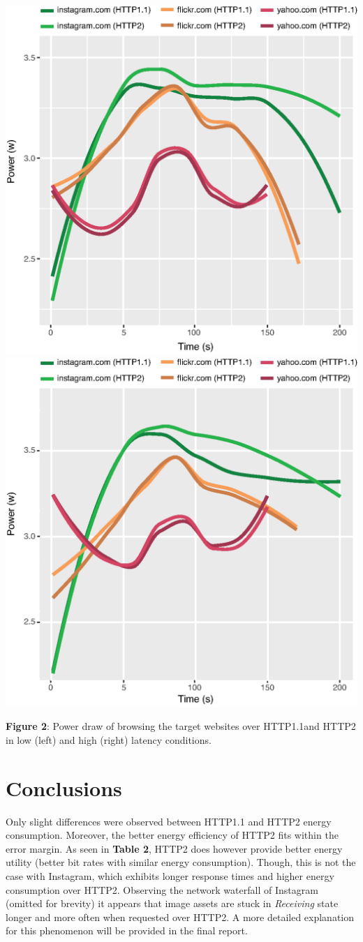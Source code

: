 \documentclass[noback]{cuposter}
\begin{document}
\centerline{
    \includegraphics[width=0.5\linewidth]{../../images/average}
    \includegraphics[width=0.5\linewidth]{../../images/average-vpn}
}
\vspace{-6mm}
\begin{center}
    \textbf{Figure 2}: Power draw of browsing the target websites over HTTP1.1\newline and HTTP2 in low (left) and high (right) latency conditions.
\end{center}

\vspace{-13mm}
\section{Conclusions}
Only slight differences were observed between HTTP1.1 and HTTP2 energy consumption. Moreover, the better energy efficiency of HTTP2 fits within the error margin. As seen in \textbf{Table 2}, HTTP2 does however provide better energy utility (better bit rates with similar energy consumption). Though, this is not the case with Instagram, which exhibits longer response times and higher energy consumption over HTTP2. Observing the network waterfall of Instagram (omitted for brevity) it appears that image assets are stuck in \emph{Receiving} state longer and more often when requested over HTTP2. A more detailed explanation for this phenomenon will be provided in the final report.
\end{document}
